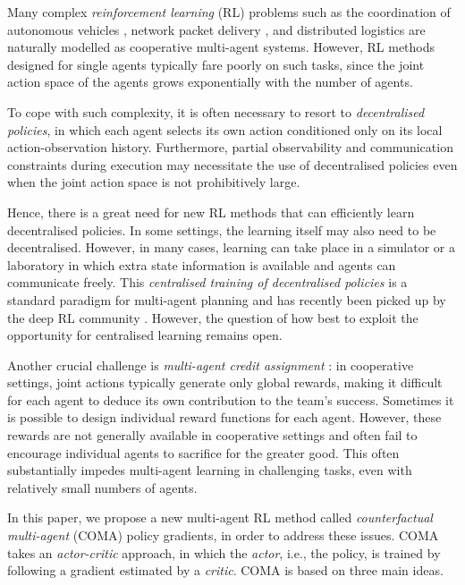 \documentclass[letterpaper]{article}
\newcommand{\citep}{\cite}
\begin{document}
Many complex \emph{reinforcement learning} (RL) problems such as the coordination of autonomous vehicles \citep{cao2013overview}, network packet delivery \citep{ye2015multi}, and distributed logistics \citep{ying2005multi} are naturally modelled as cooperative multi-agent systems.  However, RL methods designed for single agents typically fare poorly on such tasks, since the joint action space of the agents grows exponentially with the number of agents.  

To cope with such complexity, it is often necessary to resort to \emph{decentralised policies}, in which each agent selects its own action conditioned only on its local action-observation history.  Furthermore, partial observability and communication constraints during execution may necessitate the use of decentralised policies even when the joint action space is not prohibitively large.

Hence, there is a great need for new RL methods that can efficiently learn decentralised policies.  In some settings, the learning itself may also need to be decentralised.  However, in many cases, learning can take place in a simulator or a laboratory in which extra state information is available and agents can communicate freely.  This \emph{centralised training of decentralised policies} is a standard paradigm for multi-agent planning \citep{Oliehoek08JAIR,kraemer2016multi} and has recently been picked up by the deep RL community \citep{foerster2016learning,jorge2016learning}.  However, the question of how best to exploit the opportunity for centralised learning remains open.

Another crucial challenge is \emph{multi-agent credit assignment} 
\citep{chang2003all}: in cooperative settings, joint actions typically generate 
only global rewards, making it difficult for each agent to deduce its own 
contribution to the team's success.  Sometimes it is possible to design 
individual reward functions for each agent.  However, these rewards are not 
generally available in cooperative settings and often fail to encourage 
individual agents to sacrifice for the greater good. This often substantially 
impedes multi-agent learning in challenging tasks, even with relatively small 
numbers of agents.

In this paper, we propose a new multi-agent RL method called 
\emph{counterfactual multi-agent} (COMA) policy gradients, in order to address 
these issues.  COMA takes an \emph{actor-critic} \citep{konda2000actor} 
approach, in which the \emph{actor}, i.e., the policy, is trained by following 
a gradient estimated by a \emph{critic}.
COMA is based on three main ideas.  
\end{document}

